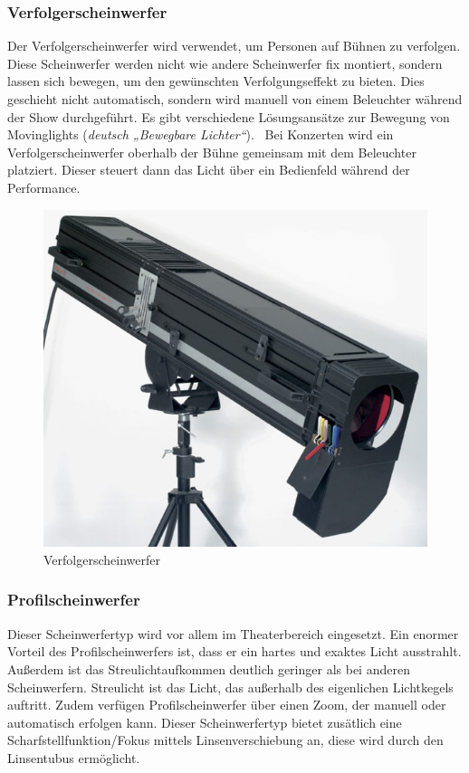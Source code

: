 \subsubsection{Verfolgerscheinwerfer}
Der Verfolgerscheinwerfer wird verwendet, um Personen auf Bühnen zu verfolgen. Diese Scheinwerfer werden nicht wie andere Scheinwerfer fix montiert, sondern lassen sich bewegen, um den gewünschten Verfolgungseffekt zu bieten. Dies geschieht nicht automatisch, sondern wird manuell von einem Beleuchter während der Show durchgeführt. Es gibt verschiedene Lösungsansätze zur Bewegung von Movinglights (\emph{deutsch „Bewegbare Lichter“}). \ Bei Konzerten wird ein Verfolgerscheinwerfer oberhalb der Bühne gemeinsam mit dem Beleuchter platziert. Dieser steuert dann das Licht über ein Bedienfeld während der Performance.\\
\cite{Verfolgerscheinwerfer}

\begin{figure}[H]
	\centering
	\includegraphics[width=0.7\linewidth]{images/Verfolgerscheinwerfer.jpg}
	\caption[Verfolgerscheinwerfer]{Verfolgerscheinwerfer}
	\label{fig:Verfolgerscheinwerfer}
\end{figure}

\subsubsection{Profilscheinwerfer}
Dieser Scheinwerfertyp wird vor allem im Theaterbereich eingesetzt. Ein enormer Vorteil des Profilscheinwerfers ist, dass er ein hartes und exaktes Licht ausstrahlt. Außerdem ist das Streulichtaufkommen deutlich geringer als bei anderen Scheinwerfern. Streulicht ist das Licht, das außerhalb des eigenlichen Lichtkegels auftritt. Zudem verfügen Profilscheinwerfer über einen Zoom, der manuell oder automatisch erfolgen kann. Dieser Scheinwerfertyp bietet zusätlich eine Scharfstellfunktion/Fokus mittels Linsenverschiebung an, diese wird durch den Linsentubus ermöglicht.\\
\cite{Profilscheinwerfer}


